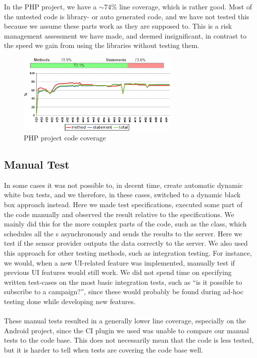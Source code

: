 In the PHP project, we have a $\sim 74\%$ line coverage, which is rather good. Most of the untested code is library- or auto generated code, and we have not tested this because we assume these parts work as they are supposed to. This is a risk management assessment we have made, and deemed insignificant, in contrast to the speed we gain from using the libraries without testing them. %

\begin{figure}[!htbp]
    \centering
    \includegraphics[width=0.7\textwidth]{graphic/quality_assurance/jenkins_php_code_coverage}
    \caption{PHP project code coverage}
    \label{fig:php_project_code_coverage}
\end{figure}
\FloatBarrier

\subsection{Manual Test}
In some cases it was not possible to, in decent time, create automatic dynamic white box tests, and we therefore, in these cases, switched to a dynamic black box approach instead. Here we made test specifications, executed some part of the code manually and observed the result relative to the specifications. We mainly did this for the more complex parts of the code, such as the  class, which schedules all the s asynchronously and sends the results to the server. Here we test if the sensor provider outputs the data correctly to the server. We also used this approach for other testing methods, such as integration testing. For instance, we would, when a new UI-related feature was implemented, manually test if previous UI features would still work. We did not spend time on specifying written test-cases on the most basic integration tests, such as ``is it possible to subscribe to a campaign?'', since these would probably be found during ad-hoc testing done while developing new features.
\\\\
These manual tests resulted in a generally lower line coverage, especially on the Android project, since the CI plugin we used was unable to compare our manual tests to the code base. This does not necessarily mean that the code is less tested, but it is harder to tell when tests are covering the code base well. 